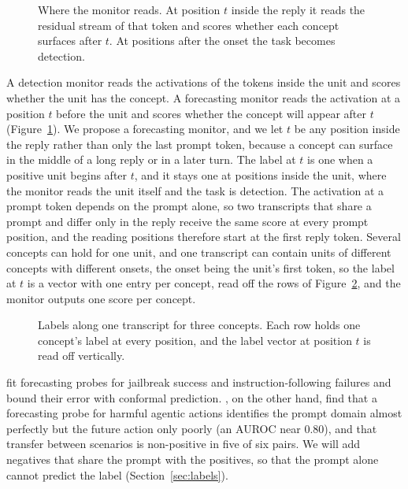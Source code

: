 \documentclass{article}
\begin{document}
\begin{figure}[t]
\centering
\resizebox{0.66\textwidth}{!}{}
\caption{Where the monitor reads. At position $t$ inside the reply it reads the residual stream of that token and scores whether each concept surfaces after $t$. At positions after the onset the task becomes detection.}
\label{fig:reads}
\end{figure}

A detection monitor reads the activations of the tokens inside the unit and scores whether the unit has the concept. A forecasting monitor reads the activation at a position $t$ before the unit and scores whether the concept will appear after $t$ (Figure~\ref{fig:reads}). We propose a forecasting monitor, and we let $t$ be any position inside the reply rather than only the last prompt token, because a concept can surface in the middle of a long reply or in a later turn. The label at $t$ is one when a positive unit begins after $t$, and it stays one at positions inside the unit, where the monitor reads the unit itself and the task is detection. The activation at a prompt token depends on the prompt alone, so two transcripts that share a prompt and differ only in the reply receive the same score at every prompt position, and the reading positions therefore start at the first reply token. Several concepts can hold for one unit, and one transcript can contain units of different concepts with different onsets, the onset being the unit's first token, so the label at $t$ is a vector with one entry per concept, read off the rows of Figure~\ref{fig:labels}, and the monitor outputs one score per concept.

\begin{figure}[t]
\centering
\resizebox{0.64\textwidth}{!}{}
\caption{Labels along one transcript for three concepts. Each row holds one concept's label at every position, and the label vector at position $t$ is read off vertically.}
\label{fig:labels}
\end{figure}

\cite{ashok2025} fit forecasting probes for jailbreak success and instruction-following failures and bound their error with conformal prediction. \cite{fomin2026}, on the other hand, find that a forecasting probe for harmful agentic actions identifies the prompt domain almost perfectly but the future action only poorly (an AUROC near 0.80), and that transfer between scenarios is non-positive in five of six pairs. We will add negatives that share the prompt with the positives, so that the prompt alone cannot predict the label (Section~\ref{sec:labels}).
\end{document}
